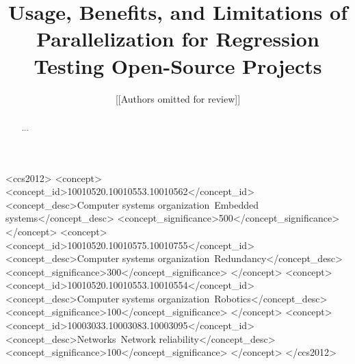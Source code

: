 \documentclass[sigconf]{acmart}
\begin{document}






\title{Usage, Benefits, and Limitations of Parallelization for Regression Testing Open-Source Projects}





\author{[[Authors omitted for review]]}


\begin{abstract}
  ...
\end{abstract}


\begin{CCSXML}
<ccs2012>
 <concept>
  <concept_id>10010520.10010553.10010562</concept_id>
  <concept_desc>Computer systems organization~Embedded systems</concept_desc>
  <concept_significance>500</concept_significance>
 </concept>
 <concept>
  <concept_id>10010520.10010575.10010755</concept_id>
  <concept_desc>Computer systems organization~Redundancy</concept_desc>
  <concept_significance>300</concept_significance>
 </concept>
 <concept>
  <concept_id>10010520.10010553.10010554</concept_id>
  <concept_desc>Computer systems organization~Robotics</concept_desc>
  <concept_significance>100</concept_significance>
 </concept>
 <concept>
  <concept_id>10003033.10003083.10003095</concept_id>
  <concept_desc>Networks~Network reliability</concept_desc>
  <concept_significance>100</concept_significance>
 </concept>
</ccs2012>  
\end{CCSXML}
\end{document}
